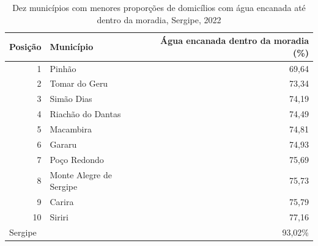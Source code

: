 \begin{table}[H]
\centering
\caption{Dez municípios com menores proporções de domicílios com água encanada até dentro da moradia, Sergipe, 2022}
\label{tab:item2-5-agua-encanada}
\small
\begin{tabular}{rlr}
\toprule
Posição & Município & Água encanada dentro da moradia (\%) \\
\midrule
1 & Pinhão & 69,64 \\
2 & Tomar do Geru & 73,34 \\
3 & Simão Dias & 74,19 \\
4 & Riachão do Dantas & 74,49 \\
5 & Macambira & 74,81 \\
6 & Gararu & 74,93 \\
7 & Poço Redondo & 75,69 \\
8 & Monte Alegre de Sergipe & 75,73 \\
9 & Carira & 75,79 \\
10 & Siriri & 77,16 \\
\midrule
\multicolumn{2}{l}{Sergipe} & 93,02\% \\
\bottomrule
\end{tabular}
\end{table}
